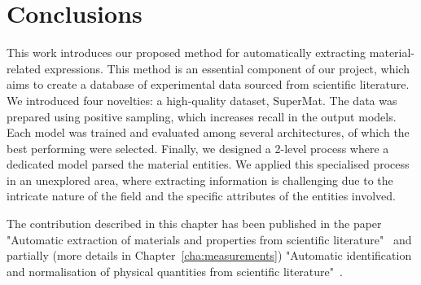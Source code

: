 \section{Conclusions}

This work introduces our proposed method for automatically extracting material-related expressions. This method is an essential component of our project, which aims to create a database of experimental data sourced from scientific literature.
We introduced four novelties: a high-quality dataset, SuperMat. The data was prepared using positive sampling, which increases recall in the output models. Each model was trained and evaluated among several architectures, of which the best performing were selected. Finally, we designed a 2-level process where a dedicated model parsed the material entities. 
We applied this specialised process in an unexplored area, where extracting information is challenging due to the intricate nature of the field and the specific attributes of the entities involved. 

The contribution described in this chapter has been published in the paper "Automatic extraction of materials and properties from scientific literature"~\cite{foppiano2023automatic} and partially (more details in Chapter~\ref{cha:measurements}) "Automatic identification and normalisation of physical quantities from scientific literature"~\cite{foppiano2019quantities}.
